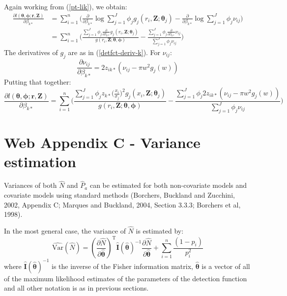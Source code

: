 \documentclass{report}
\begin{document}
Again working from (\ref{pt-lik}), we obtain:
\begin{align*}
\frac{\partial l(\bm{\theta}, \bm{\phi}; \mathbf{r},\mathbf{Z})}{\partial \beta_{k*}}  &= \sum_{i=1}^n \Big( \frac{\partial}{\partial \beta_{k*}} \log \sum_{j=1}^J \phi_j g_j(r_i,\mathbf{Z}; \bm{\theta}_j) - \frac{\partial}{\partial \beta_{k*}}\log \sum_{j=1}^J \phi_j \nu_{ij}\Big)\\
&= \sum_{i=1}^n \Big( \frac{ \sum_{j=1}^J \phi_{j} \frac{\partial}{\partial \beta_{k*}}  g_{j} (r_i,\mathbf{Z}; \bm{\theta}_j)}{g(r_i,\mathbf{Z}; \bm{\theta}, \bm{\phi})} - \frac{ \sum_{j=1}^J \phi_{j}\frac{\partial}{\partial \beta_{k*}}  \nu_{ij} }{ \sum_{j=1}^J \phi_j \nu_{ij}}\Big)
\end{align*}
The derivatives of $g_j$ are as in (\ref{detfct-deriv-k}). For $\nu_{ij}$:
\begin{equation*}
\frac{\partial \nu_{ij}}{\partial \beta_{k*}} =  2z_{ik*}(\nu_{ij} - \pi w^2 g_j(w))
\end{equation*}
Putting that together:
\begin{equation*}
\frac{\partial l(\bm{\theta}, \bm{\phi}; \mathbf{r},\mathbf{Z})}{\partial \beta_{k*}}  = \sum_{i=1}^n \Big( \frac{ \sum_{j=1}^J \phi_{j} z_{k*} \Big( \frac{x_i}{\sigma_{j}}\Big)^2 g_j(x_i,\mathbf{Z}; \bm{\theta}_j)}{g(r_i,\mathbf{Z}; \bm{\theta}, \bm{\phi})} - \frac{ \sum_{j=1}^J \phi_{j}2z_{ik*}(\nu_{ij} - \pi w^2 g_j(w)) }{ \sum_{j=1}^J \phi_j \nu_{ij}}\Big)
\end{equation*}


\section*{Web Appendix C - Variance estimation}

Variances of both $\hat{N}$ and $\hat{P}_a$ can be estimated for both non-covariate models and covariate models using standard methods (Borchers, Buckland and Zucchini, 2002, Appendix C; Marques and Buckland, 2004, Section 3.3.3; Borchers et al, 1998).

In the most general case, the variance of $\hat{N}$ is estimated by:
\begin{equation*}
\hat{\text{Var}}\left( \hat{N} \right) = \left(\frac{\partial \hat{N}}{\partial\hat{\bm{\theta}}}\right)^\text{T}\hat{\mathbf{I}}(\hat{\bm{\theta}})^{-1}\frac{\partial \hat{N}}{\partial\hat{\bm{\theta}}} + \sum_{i=1}^n \frac{(1-p_i)}{p_i^2}
\end{equation*}
where $\hat{\mathbf{I}}(\hat{\bm{\theta}})^{-1}$ is the inverse of the Fisher information matrix,  $\hat{\bm{\theta}}$ is a vector of all of the maximum likelihood estimates of the parameters of the detection function and all other notation is as in previous sections.
\end{document}
